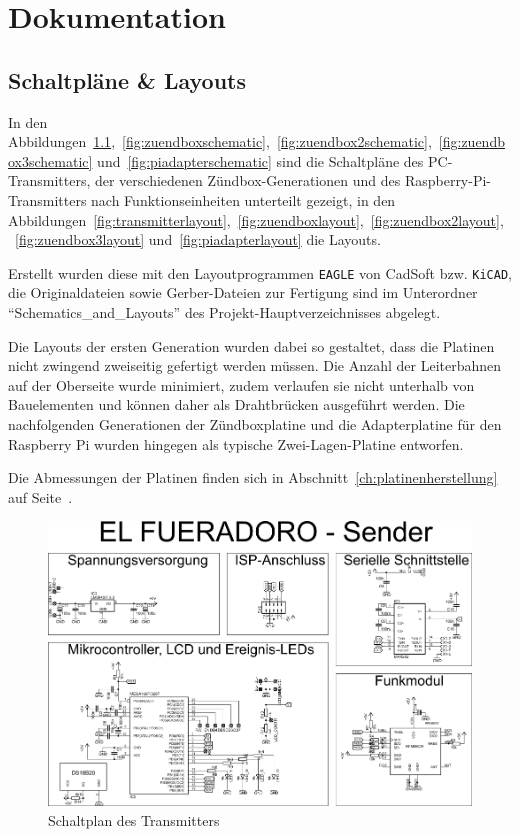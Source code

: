 \documentclass[paper=a4, parskip, numbers=noenddot, toc=listof, headsepline]{scrbook}
\begin{document}
\part{Dokumentation}
	\label{part:dokumentation}

	\chapter{Schaltpläne \& Layouts}

		In den Abbildungen~\ref{fig:transmitterschematic},~\ref{fig:zuendboxschematic},~\ref{fig:zuendbox2schematic},~\ref{fig:zuendbox3schematic} und~\ref{fig:piadapterschematic} sind die Schaltpläne des PC-Transmitters, der verschiedenen Zündbox-Generationen und des Raspberry-Pi-Transmitters nach Funk\-tions\-ein\-heiten unterteilt gezeigt, in den Abbildungen~\ref{fig:transmitterlayout},~\ref{fig:zuendboxlayout},~\ref{fig:zuendbox2layout}, ~\ref{fig:zuendbox3layout} und~\ref{fig:piadapterlayout} die Layouts.

		Erstellt wurden diese mit den Layoutprogrammen \texttt{EAGLE} von CadSoft bzw. \texttt{KiCAD}, die Originaldateien sowie Gerber-Dateien zur Fertigung sind im Unterordner \enquote{Schematics\_and\_Layouts} des Projekt-Hauptverzeichnisses abgelegt.

		Die Layouts der ersten Generation wurden dabei so gestaltet, dass die Platinen nicht zwingend zweiseitig gefertigt werden müssen. Die Anzahl der Leiterbahnen auf der Oberseite wurde minimiert, zudem verlaufen sie nicht unterhalb von Bauelementen und können daher als Drahtbrücken ausgeführt werden. Die nachfolgenden Generationen der Zündboxplatine und die Adapterplatine für den Raspberry Pi wurden hingegen als typische Zwei-Lagen-Platine entworfen.

		Die Abmessungen der Platinen finden sich in Abschnitt~\ref{ch:platinenherstellung} auf Seite~\pageref{ch:platinenherstellung}.

		\begin{figure}
			\centering
			\includegraphics[angle=-90, width=.9\textwidth, keepaspectratio]{Bilder/Transmitterschaltplan}
			\caption{Schaltplan des Transmitters}
			\label{fig:transmitterschematic}
		\end{figure}
\end{document}
